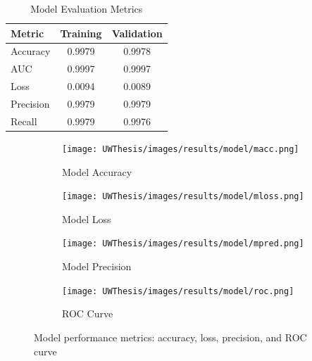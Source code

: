 \documentclass [11pt, proquest] {uwthesis}[2020/02/24]
\begin{document}
\begin{table}[htbp]
\centering
\caption{Model Evaluation Metrics}
\label{model_metrics}
\begin{tabular}{lcc}
\hline
Metric & Training & Validation \\
\hline
Accuracy & 0.9979 & 0.9978 \\
AUC & 0.9997 & 0.9997 \\
Loss & 0.0094 & 0.0089 \\
Precision & 0.9979 & 0.9979 \\
Recall & 0.9979 & 0.9976 \\
\hline
\end{tabular}
\end{table}
\begin{figure}[H]
  \centering
  \begin{subfigure}[b]{0.48\textwidth}
    \texttt{[image: UWThesis/images/results/model/macc.png]}
    \caption{Model Accuracy}
    \label{fig:image1}
  \end{subfigure}
  \hspace{0.02\textwidth}
  \begin{subfigure}[b]{0.48\textwidth}
    \texttt{[image: UWThesis/images/results/model/mloss.png]}
    \caption{Model Loss}
    \label{fig:image2}
  \end{subfigure}

  \vspace{0.3cm}

  \begin{subfigure}[b]{0.48\textwidth}
    \texttt{[image: UWThesis/images/results/model/mpred.png]}
    \caption{Model Precision}
    \label{fig:image3}
  \end{subfigure}
  \hspace{0.02\textwidth}
  \begin{subfigure}[b]{0.48\textwidth}
    \texttt{[image: UWThesis/images/results/model/roc.png]}
    \caption{ROC Curve}
    \label{fig:image4}
  \end{subfigure}

  \caption{Model performance metrics: accuracy, loss, precision, and ROC curve}
  \label{fig:model_metrics_quadrant}
\end{figure}
\end{document}
